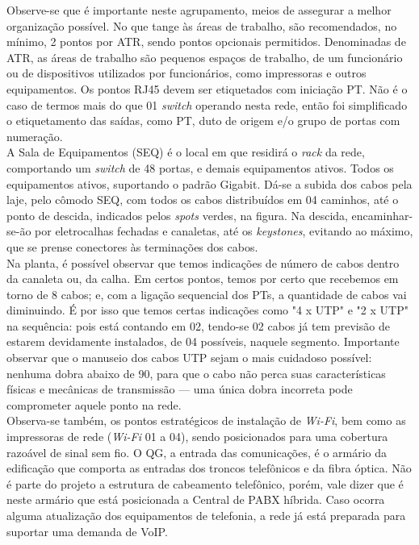 \documentclass[	DIV=calc,%
							paper=a4,%
							fontsize=12pt,%
							onecolumn]{scrartcl}	 					%
\begin{document}
Observe-se que é importante neste agrupamento, meios de assegurar a melhor organização possível. No que tange às áreas de trabalho, são recomendados, no mínimo, 2 pontos por ATR, sendo pontos opcionais permitidos. Denominadas de ATR, as áreas de trabalho são pequenos espaços de trabalho, de um funcionário ou de dispositivos utilizados por funcionários, como impressoras e outros equipamentos. Os pontos RJ45 devem ser etiquetados com iniciação PT. Não é o caso de termos mais do que 01 \textit{switch} operando nesta rede, então foi simplificado o etiquetamento das saídas, como PT, duto de origem e/o grupo de portas com numeração.
\\

A Sala de Equipamentos (SEQ) é o local em que residirá o \textit{rack} da rede, comportando um \textit{switch} de 48 portas, e demais equipamentos ativos. Todos os equipamentos ativos, suportando o padrão Gigabit. Dá-se a subida dos cabos pela laje, pelo cômodo SEQ, com todos os cabos distribuídos em 04 caminhos, até o ponto de descida, indicados pelos \textit{spots} verdes, na figura. Na descida, encaminhar-se-ão por eletrocalhas fechadas e canaletas, até os \textit{keystones}, evitando ao máximo, que se prense conectores às terminações dos cabos. 
\\

Na planta, é possível observar que temos indicações de número de cabos dentro da canaleta ou, da calha. Em certos pontos, temos por certo que recebemos em torno de 8 cabos; e, com a ligação sequencial dos PTs, a quantidade de cabos vai diminuindo. É por isso que temos certas indicações como "4 x UTP" e "2 x UTP" na sequência: pois está contando em 02, tendo-se 02 cabos já tem previsão de estarem devidamente instalados, de 04 possíveis, naquele segmento. Importante observar que o manuseio dos cabos UTP sejam o mais cuidadoso possível: nenhuma dobra abaixo de 90, para que o cabo não perca suas características físicas e mecânicas de transmissão --- uma única dobra incorreta pode comprometer aquele ponto na rede. 
\\

Observa-se também, os pontos estratégicos de instalação de \textit{Wi-Fi}, bem como as impressoras de rede (\textit{Wi-Fi} 01 a 04), sendo posicionados para uma cobertura razoável de sinal sem fio. O QG, a entrada das comunicações, é o armário da edificação que comporta as entradas dos troncos telefônicos e da fibra óptica. Não é parte do projeto a estrutura de cabeamento telefônico, porém, vale dizer que é neste armário que está posicionada a Central de PABX híbrida. Caso ocorra alguma atualização dos equipamentos de telefonia, a rede já está preparada para suportar uma demanda de VoIP. 
\end{document}
